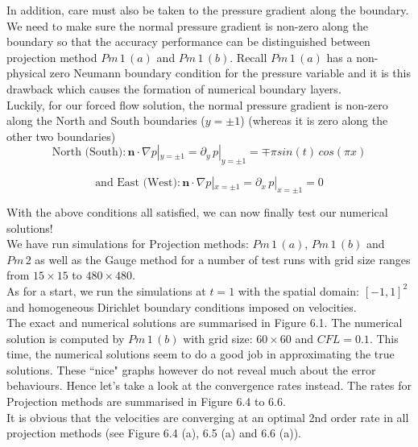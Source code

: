 In addition, care must also be taken to the pressure gradient along the boundary. We need to make sure the normal pressure gradient is non-zero along the boundary so that the accuracy performance can be distinguished between projection method $Pm\,1\,(a)$ and $Pm\,1\,(b)$. Recall $Pm\,1\,(a)$ has a non-physical zero Neumann boundary condition for the pressure variable and it is this drawback which causes the formation of numerical boundary layers.\\
Luckily, for our forced flow solution, the normal pressure gradient is non-zero along the North and South boundaries ($y = \pm 1$) (whereas it is zero along the other two boundaries)
\begin{equation*}
\text{North (South):}\, \textbf{n}\cdot \nabla p |_{y = \pm 1} = \partial_y\,p |_{y = \pm 1} = \mp \pi sin(t)\,cos(\pi x)
\end{equation*}

\begin{equation*}
\text{and East (West):}\,\textbf{n}\cdot \nabla p |_{x = \pm 1} = \partial_x\,p |_{x = \pm 1} = 0
\end{equation*}

With the above conditions all satisfied, we can now finally test our numerical solutions!\\

We have run simulations for Projection methods: $Pm\,1\,(a)$, $Pm\,1\,(b)$ and $Pm\,2$ as well as the Gauge method for a number of test runs with grid size ranges from $15 \times 15$ to $480 \times 480$.\\

As for a start, we run the simulations at $t = 1$ with the spatial domain: $[-1,1]^2$ and homogeneous Dirichlet boundary conditions imposed on velocities.\\

The exact and numerical solutions are summarised in Figure 6.1. The numerical solution is computed by $Pm\,1\,(b)$ with grid size: $60 \times 60$ and $CFL = 0.1$. This time, the numerical solutions seem to do a good job in approximating the true solutions. These ``nice" graphs however do not reveal much about the error behaviours. Hence let's take a look at the convergence rates instead. The rates for Projection methods are summarised in Figure 6.4 to 6.6. \\

It is obvious that the velocities are converging at an optimal 2nd order rate in all projection methods (see Figure 6.4 (a), 6.5 (a) and 6.6 (a)).\\

